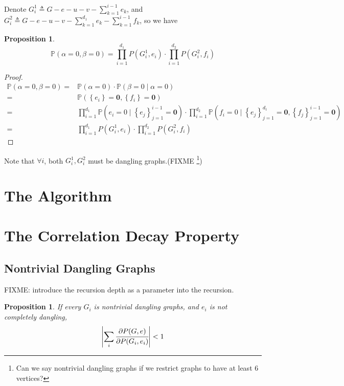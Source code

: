 \documentclass[a4paper]{article}
\newtheorem{Prop}[Thm]{Proposition}
\newcommand{\abs}[1]{\left\vert#1\right\vert}
\newcommand{\set}[1]{\left\{#1\right\}}
\begin{document}
Denote $G_i^1 \triangleq G - e - u - v - \sum_{k=1}^{i-1} e_k$, and $G_i^2 \triangleq G-e-u-v - \sum_{k=1}^{d_1}e_k - \sum_{k=1}^{i-1} f_k$,
so we have

\begin{Prop}
		
	\[\mathbb{P}\left( \alpha = 0, \beta = 0 \right)= \prod_{i=1}^{d_1} P(G_i^1, e_i) \cdot \prod_{i=1}^{d_2} P(G_i^2, f_i) \]

\end{Prop}

\begin{proof}
	\begin{align*}
		\mathbb{P}\left( \alpha = 0, \beta = 0 \right) =& \mathbb{P} \left( \alpha = 0 \right) \cdot \mathbb{P}\left( \beta = 0 \mid \alpha = 0 \right) \\
		=& \mathbb{P} \left( \set{e_i} = \mathbf{0}, \set{f_i} = \mathbf{0} \right) \\
=&\prod_{i=1}^{d_1} \mathbb{P} \left( e_i = 0 \mid \set{e_j}_{j=1}^{i-1} = \mathbf{0} \right) \cdot \prod_{i=1}^{d_2} \mathbb{P} \left( f_i = 0 \mid \set{e_j}_{j=1}^{d_1} = \mathbf{0},\set{f_j}_{j=1}^{i-1} = \mathbf{0} \right) \\
=& \prod_{i=1}^{d_1} P(G_i^1, e_i) \cdot \prod_{i=1}^{d_2} P(G_i^2, f_i) 
	\end{align*}
\end{proof}

Note that $\forall i$, both $G_i^1, G_i^2$ must be dangling graphs.(FIXME \footnote{ Can we say nontrivial dangling graphs if we restrict graphs to have at least 6 vertices?})

\section{The Algorithm}


\section{The Correlation Decay Property}
	\subsection{Nontrivial Dangling Graphs}
	FIXME: introduce the recursion depth as a parameter into the recursion.

	\begin{Prop}
		If every $G_i$ is nontrivial dangling graphs, and $e_i$ is not completely dangling, 
		\begin{align*}
			\abs{\sum_i \cfrac{\partial P(G,e)}{\partial P(G_i,e_i)}} < 1 
		\end{align*}
	\end{Prop}
\end{document}
